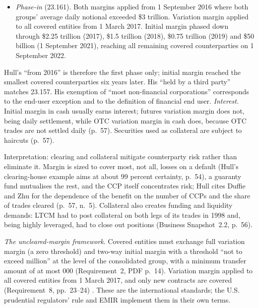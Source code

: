 \begin{qfmechanism}
\begin{itemize}
The definitions set a \$50 million initial-margin threshold amount(23.154). No transfer is required below a combined minimum transfer amount of \$500{,}000 (23.152(b)(3), 23.153(c), 23.151).
\item \emph{Phase-in} (23.161). Both margins applied from 1 September 2016 where both groups' average daily notional exceeded \$3 trillion. Variation margin applied to all covered entities from 1 March 2017. Initial margin phased down through \$2.25 trillion (2017), \$1.5 trillion (2018), \$0.75 trillion (2019) and \$50 billion (1 September 2021), reaching all remaining covered counterparties on 1 September 2022.
\end{itemize}
Hull's ``from 2016'' is therefore the first phase only; initial margin reached the smallest covered counterparties six years later. His ``held by a third party'' matches 23.157. His exemption of ``most non-financial corporations'' corresponds to the end-user exception and to the definition of financial end user. \emph{Interest.} Initial margin in cash usually earns interest; futures variation margin does not, being daily settlement, while OTC variation margin in cash does, because OTC trades are not settled daily (p.~57). Securities used as collateral are subject to haircuts (p.~57).

 Interpretation: clearing and collateral mitigate counterparty risk rather than eliminate it. Margin is sized to cover most, not all, losses on a default (Hull's clearing-house example aims at about 99 percent certainty, p.~54), a guaranty fund mutualises the rest, and the CCP itself concentrates risk; Hull cites Duffie and Zhu for the dependence of the benefit on the number of CCPs and the share of trades cleared (p.~57, n.~5). Collateral also creates funding and liquidity demands: LTCM had to post collateral on both legs of its trades in 1998 and, being highly leveraged, had to close out positions (Business Snapshot~2.2, p.~56).

\emph{The uncleared-margin framework}. Covered entities must exchange full variation margin (a zero threshold) and two-way initial margin with a threshold ``not to exceed  million'' at the level of the consolidated group, with a minimum transfer amount of at most 000 (Requirement~2, PDF p.~14). Variation margin applied to all covered entities from 1 March 2017, and only new contracts are covered (Requirement~8, pp.~23--24) \citep[April 2020, Requirements~2 and~8, printed pp.~10 and~23--24]{bcbs-iosco-margin-2020}. These are the international standards; the U.S. prudential regulators' rule and EMIR implement them in their own terms.


\end{qfmechanism}

